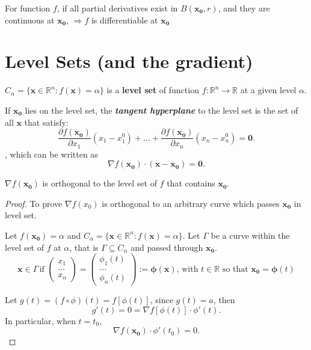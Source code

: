 \begin{proposition}
    For function $f$, if all partial derivatives exist in $B(\mathbf{x_0},r)$, and they are continuous at $\mathbf{x_0}$, $\Longrightarrow f$ is differentiable at $\mathbf{x_0}$
\end{proposition}

\section{Level Sets (and the gradient)}


\begin{definition}
    $C_\alpha = \{\mathbf{x} \in \mathbb{R}^{n}: f(\mathbf{x}) = \alpha\}$ is a \textbf{level set} of function $f: \mathbb{R}^{n} \to \mathbb{R}$ at a given level $\alpha$.
\end{definition}

If $\mathbf{x_0}$ lies on the level set, the \textit{\textbf{tangent hyperplane}} to the level set is the set of all $\mathbf{x}$ that satisfy: \[
    \frac{\partial f(\mathbf{x_0})}{\partial x_1}(x_1-x_1 ^{0}) + \dots+ \frac{\partial f(\mathbf{x_0})}{\partial x_n}(x_n-x_n ^{0}) = \mathbf{0}.
\]
, which can be written as \[
    \nabla f(\mathbf{x_0}) \cdot (\mathbf{x - x_0}) = \mathbf{0}.
\]

\begin{proposition}
    $\nabla f(\mathbf{x_0})$ is orthogonal to the level set of $f$ that contains $\mathbf{x_0}$.
\end{proposition}

\begin{proof}
    To prove $\nabla f(x_0)$ is orthogonal to an arbitrary curve which passes $\mathbf{x_0}$ in level set.

    Let $f(\mathbf{x_0}) = \alpha$ and $C_\alpha = \{\mathbf{x} \in \mathbb{R}^{n}: f(\mathbf{x}) = \alpha\}$. Let $\Gamma$ be a curve within the level set of $f$ at $\alpha$, that is $\Gamma \subseteq C_\alpha$ and passed through $\mathbf{x_0}$. \[
        \mathbf{x} \in \Gamma \, \text{if } \begin{pmatrix}
            x_1 \\ \dots \\ x_n
        \end{pmatrix} = \begin{pmatrix}
            \phi_1(t) \\ \dots \\ \phi_n(t)
        \end{pmatrix} := \boldsymbol{\phi}(\mathbf{x}), \, \text{with } t \in \mathbb{R} \text{ so that } \mathbf{x_0} = \boldsymbol{\phi}(t)
    \]

    Let $g(t) = (f \circ \phi )(t) = f[\phi (t)]$, since $g(t) = a$, then \[
        g'(t) = 0 = \nabla f[\phi (t)] \cdot \phi' (t).
    \]
    In particular, when $t=t_0$, \[
        \nabla f(\mathbf{x_0}) \cdot \phi'(t_0) = 0.
    \]
\end{proof}

